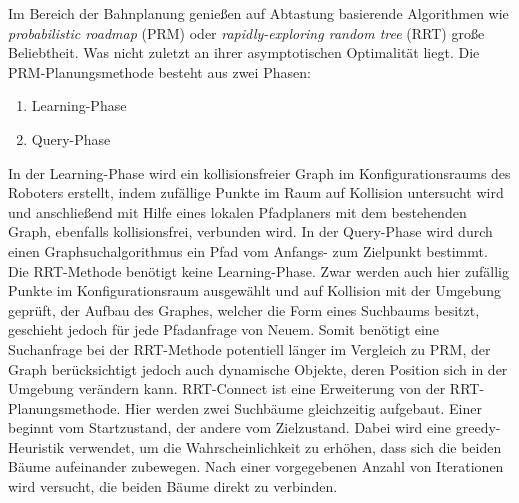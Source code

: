 Im Bereich der Bahnplanung genießen auf Abtastung basierende Algorithmen wie \textit{probabilistic roadmap} (PRM) oder \textit{rapidly-exploring random tree} (RRT) große Beliebtheit. Was nicht zuletzt an ihrer asymptotischen Optimalität \cite{SamplingAlgos} liegt.
\newline
Die PRM-Planungsmethode \cite{PRM} besteht aus zwei Phasen:
\begin{enumerate}
	\item Learning-Phase
	\item Query-Phase
\end{enumerate}
In der Learning-Phase wird ein kollisionsfreier Graph im Konfigurationsraums des Roboters erstellt, indem zufällige Punkte im Raum auf Kollision untersucht wird und anschließend mit Hilfe eines lokalen Pfadplaners mit dem bestehenden Graph, ebenfalls kollisionsfrei, verbunden wird. In der Query-Phase wird durch einen Graphsuchalgorithmus ein Pfad vom Anfangs- zum Zielpunkt bestimmt.
\newline
Die RRT-Methode \cite{RRT} benötigt keine Learning-Phase. Zwar werden auch hier zufällig Punkte im Konfigurationsraum ausgewählt und auf Kollision mit der Umgebung geprüft, der Aufbau des Graphes, welcher die Form eines Suchbaums besitzt, geschieht jedoch für jede Pfadanfrage von Neuem. Somit benötigt eine Suchanfrage bei der RRT-Methode potentiell länger im Vergleich zu PRM, der Graph berücksichtigt jedoch auch dynamische Objekte, deren Position sich in der Umgebung verändern kann.
\newline
RRT-Connect \cite{RRTConnect} ist eine Erweiterung von der RRT-Planungsmethode. Hier werden zwei Suchbäume gleichzeitig aufgebaut. Einer beginnt vom Startzustand, der andere vom Zielzustand. Dabei wird eine greedy-Heuristik verwendet, um die Wahrscheinlichkeit zu erhöhen, dass sich die beiden Bäume aufeinander zubewegen. Nach einer vorgegebenen Anzahl von Iterationen wird versucht, die beiden Bäume direkt zu verbinden.
